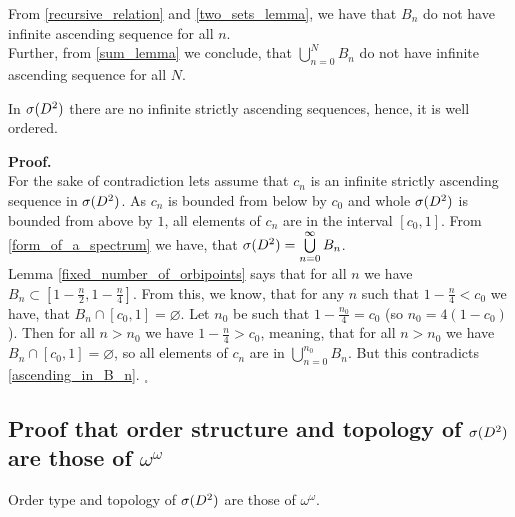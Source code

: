 \begin{observation}\label{ascending_in_B_n}
From \ref{recursive_relation} and \ref{two_sets_lemma}, we have that $B_n$ do not have 
infinite ascending sequence for all $n$. \\
Further, from \ref{sum_lemma} we conclude, 
that $\bigcup\limits_{n=0}^N B_n$ do not have infinite ascending sequence for all $N$.
\end{observation}

\begin{theorem}\label{well_order}
In ${{\sigma}(D^2)}$ there are no infinite strictly ascending sequences, hence, it is well ordered.
\end{theorem}
\noindent\textbf{Proof.} \\
For the sake of contradiction lets assume that $c_n$ is an infinite strictly ascending sequence in 
${{\sigma}(D^2)}$. As $c_n$ is bounded from below by $c_0$ and whole ${{\sigma}(D^2)}$ is bounded from above 
by $1$, all elements of $c_n$ are in the interval $[c_0, 1]$. 
From \ref{form_of_a_spectrum} we have, that ${{\sigma}(D^2)} = \bigcup\limits^\infty_{n=0}B_n$. \\
Lemma 
\ref{fixed_number_of_orbipoints} says that for all $n$ we
have $B_n \subset [1-\frac{n}{2}, 1 - \frac{n}{4}]$. From this, we know, that for any 
$n$ such that $1 - \frac{n}{4} < c_0$ 
we have, that $B_n \cap [c_0,1] = \varnothing $. Let $n_0$ be such that 
$1 - \frac{n_0}{4} = c_0$ (so $n_0 = 4(1-c_0)$). 
Then for all $n > n_0$ we have $1 - \frac{n}{4} > c_0$, meaning, that 
for all $n > n_0$ we have
$B_n \cap [c_0,1] = \varnothing $, so all elements of $c_n$ are in 
$\bigcup\limits_{n=0}^{n_0} B_n$.
But this contradicts \ref{ascending_in_B_n}.  $_\square$









\subsection{Proof that order structure and topology of ${{\sigma}(D^2)}$ are those of $\omega^\omega$}

\begin{theorem}\label{speD_theorem}
Order type and topology of ${{\sigma}(D^2)}$ are those of $\omega^\omega$. 
\end{theorem}

